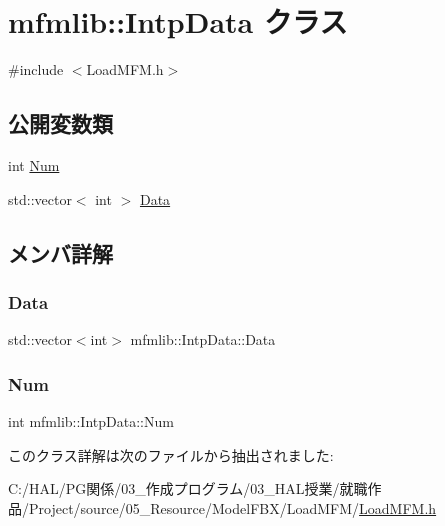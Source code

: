 \hypertarget{classmfmlib_1_1_intp_data}{}\section{mfmlib\+:\+:Intp\+Data クラス}
\label{classmfmlib_1_1_intp_data}


{\ttfamily \#include $<$Load\+M\+F\+M.\+h$>$}

\subsection*{公開変数類}
\begin{DoxyCompactItemize}
\item 
int \mbox{\hyperlink{classmfmlib_1_1_intp_data_a37095e24cb32a0effa481f42b378c048}{Num}}
\item 
std\+::vector$<$ int $>$ \mbox{\hyperlink{classmfmlib_1_1_intp_data_a14d5af9ed9c62c44dfcd7cb35afbe11e}{Data}}
\end{DoxyCompactItemize}


\subsection{メンバ詳解}
\mbox{\label{classmfmlib_1_1_intp_data_a14d5af9ed9c62c44dfcd7cb35afbe11e}} 
\subsubsection{\texorpdfstring{Data}{Data}}
{\footnotesize\ttfamily std\+::vector$<$int$>$ mfmlib\+::\+Intp\+Data\+::\+Data}

\mbox{\label{classmfmlib_1_1_intp_data_a37095e24cb32a0effa481f42b378c048}} 
\subsubsection{\texorpdfstring{Num}{Num}}
{\footnotesize\ttfamily int mfmlib\+::\+Intp\+Data\+::\+Num}



このクラス詳解は次のファイルから抽出されました\+:\begin{DoxyCompactItemize}
\item 
C\+:/\+H\+A\+L/\+P\+G関係/03\+\_\+作成プログラム/03\+\_\+\+H\+A\+L授業/就職作品/\+Project/source/05\+\_\+\+Resource/\+Model\+F\+B\+X/\+Load\+M\+F\+M/\mbox{\hyperlink{_load_m_f_m_8h}{Load\+M\+F\+M.\+h}}\end{DoxyCompactItemize}
